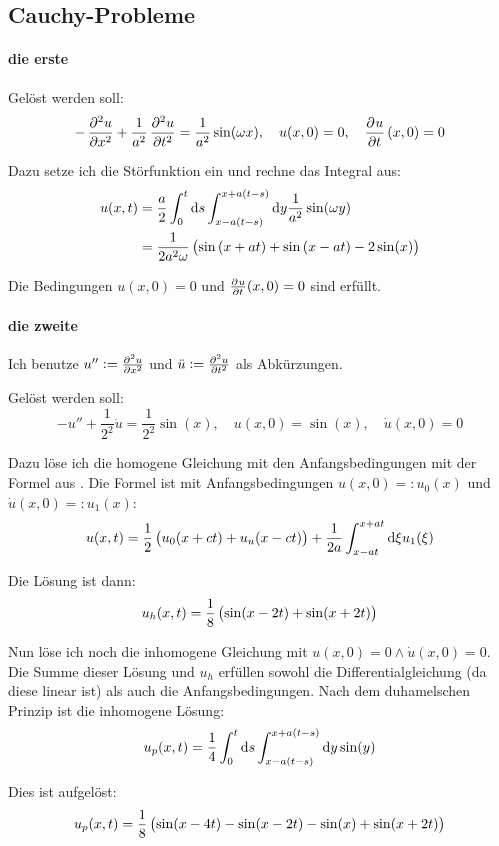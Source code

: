 \documentclass[11pt, ngerman, fleqn]{article}
\newcommand{\half}{\frac 12}
\begin{document}
\subsection{Cauchy-Probleme}

\paragraph{die erste}

Gelöst werden soll:
\[
	- \dpd[2]ux + \frac{1}{a^2} \dpd[2]ut = \frac{1}{a^2} \sin(\omega x)
	,\quad
	u(x, 0) = 0
	,\quad
	\dpd ut(x, 0) = 0
\]

Dazu setze ich die Störfunktion ein und rechne das Integral aus:
\begin{align*}
	u(x, t) &= \frac a2 \int_0^t \dif s \int_{x-a(t-s)}^{x+a(t-s)} \dif y \frac{1}{a^2} \sin(\omega y) \\
   &= \frac{1}{2 a^2 \omega} \del{\sin\del{x+at} + \sin\del{x-at} - 2 \sin(x)}
\end{align*}

Die Bedingungen $u(x, 0) = 0$ und $\pd ut(x, 0) = 0$ sind erfüllt.

\paragraph{die zweite}

Ich benutze $u'' := \pd[2]ux$ und $\ddot u := \pd[2]ut$ als Abkürzungen.

Gelöst werden soll:
\[
	- u'' + \frac{1}{2^2} \ddot u = \frac 1{2^2} \sin(x)
	,\quad
	u(x, 0) = \sin(x)
	,\quad
	\dot u(x, 0) = 0
\]

Dazu löse ich die homogene Gleichung mit den Anfangsbedingungen mit der Formel aus \cite[Seite 41]{john-1910}. Die Formel ist mit Anfangsbedingungen $u(x, 0) =: u_0(x)$ und $\dot u(x, 0) =: u_1(x)$:
\[
	u(x, t) = \half \del{
		u_0(x+ct) + u_u(x-ct)
	}
	+ \frac{1}{2a} \int_{x-at}^{x+at} \dif \xi u_1(\xi)
\]

Die Lösung ist dann:
\[
	u_h(x, t) = \frac 18 \del{\sin(x - 2t) + \sin(x + 2t)}
\]

Nun löse ich noch die inhomogene Gleichung mit $u(x, 0) = 0 \wedge \dot u(x, 0) = 0$. Die Summe dieser Lösung und $u_h$ erfüllen sowohl die Differentialgleichung (da diese linear ist) als auch die Anfangsbedingungen. Nach dem duhamelschen Prinzip ist die inhomogene Lösung:
\[
	u_p(x, t)
	= \frac 14 \int_0^t \dif s \int_{x-a(t-s)}^{x+a(t-s)} \dif y \sin(y)
\]

Dies ist aufgelöst:
\[
	u_p(x, t)
	= \frac 18 \del{
		\sin(x-4t) - \sin(x-2t) - \sin(x) + \sin(x+2t)
	}
\]
\end{document}
